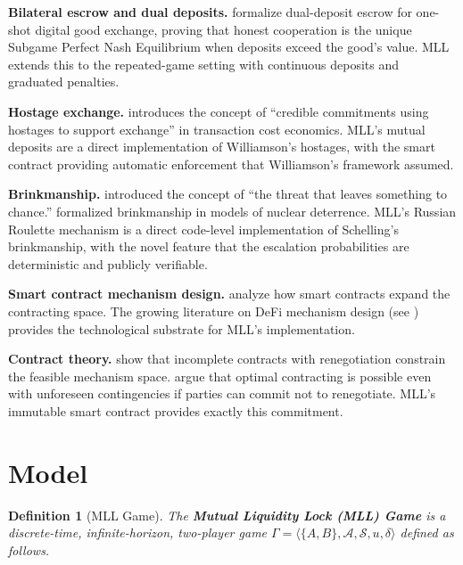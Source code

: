 \documentclass[12pt,a4paper]{article}
\newtheorem{definition}{Definition}
\begin{document}
\textbf{Bilateral escrow and dual deposits.} \citet{asgaonkar2019} formalize dual-deposit escrow for one-shot digital good exchange, proving that honest cooperation is the unique Subgame Perfect Nash Equilibrium when deposits exceed the good's value. MLL extends this to the repeated-game setting with continuous deposits and graduated penalties.

\textbf{Hostage exchange.} \citet{williamson1983} introduces the concept of ``credible commitments using hostages to support exchange'' in transaction cost economics. MLL's mutual deposits are a direct implementation of Williamson's hostages, with the smart contract providing automatic enforcement that Williamson's framework assumed.

\textbf{Brinkmanship.} \citet{schelling1960,schelling1966} introduced the concept of ``the threat that leaves something to chance.'' \citet{powell1988,powell1990} formalized brinkmanship in models of nuclear deterrence. MLL's Russian Roulette mechanism is a direct code-level implementation of Schelling's brinkmanship, with the novel feature that the escalation probabilities are deterministic and publicly verifiable.

\textbf{Smart contract mechanism design.} \citet{cong2019} analyze how smart contracts expand the contracting space. The growing literature on DeFi mechanism design (see \citet{harvey2021}) provides the technological substrate for MLL's implementation.

\textbf{Contract theory.} \citet{hart1988} show that incomplete contracts with renegotiation constrain the feasible mechanism space. \citet{maskin1999} argue that optimal contracting is possible even with unforeseen contingencies if parties can commit not to renegotiate. MLL's immutable smart contract provides exactly this commitment.



\section{Model}
\label{sec:model}

\begin{definition}[MLL Game]
The \textbf{Mutual Liquidity Lock (MLL) Game} is a discrete-time, infinite-horizon, two-player game $\Gamma = \langle \{A, B\}, \mathcal{A}, \mathcal{S}, u, \delta \rangle$ defined as follows.
\end{definition}
\end{document}

